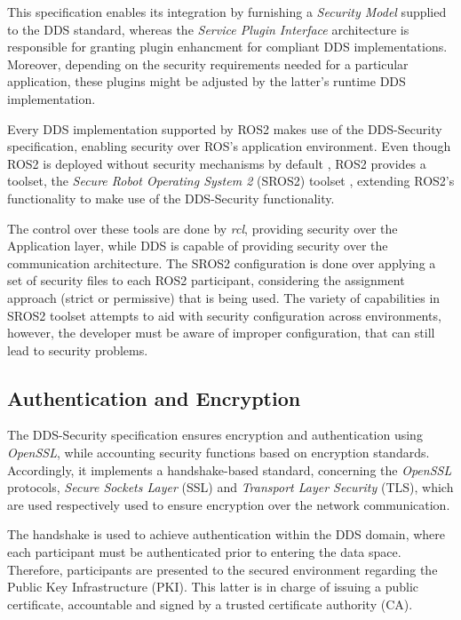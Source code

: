 This specification enables its integration by furnishing a \textit{Security Model} supplied to the DDS standard, whereas the \textit{Service Plugin Interface} architecture is responsible for granting plugin enhancment for compliant DDS implementations. Moreover, depending on the security requirements needed for a particular application, these plugins might be adjusted by the latter's runtime DDS implementation. \cite{dds-s}

Every DDS implementation supported by ROS2 makes use of the DDS-Security specification, enabling security over ROS's application environment. Even though ROS2 is deployed without security mechanisms by default \cite{ros-dds-integration}, ROS2 provides a toolset, the \textit{Secure Robot Operating System 2} (SROS2) toolset \cite{sros2-gh}, extending ROS2's functionality to make use of the DDS-Security functionality. 

The control over these tools are done by \textit{rcl}, providing security over the Application layer, while DDS is capable of providing security over the communication architecture. \cite{kim2018security} The SROS2 configuration is done over applying a set of security files to each ROS2 participant, considering the assignment approach (strict or permissive) that is being used. The variety of capabilities in SROS2 toolset attempts to aid with security configuration across environments, however, the developer must be aware of improper configuration, that can still lead to security problems. \cite{ros-dds-integration}

\subsection{Authentication and Encryption}

The DDS-Security specification ensures encryption and authentication using \textit{OpenSSL}, while accounting security functions based on encryption standards. \cite{takemoto2019performance} Accordingly, it implements a handshake-based standard, concerning the \textit{OpenSSL} protocols, \textit{Secure Sockets Layer} (SSL) and \textit{Transport Layer Security} (TLS), which are used respectively used to ensure encryption over the network communication. \cite{white2016sros, kim2018security}

The handshake is used to achieve authentication within the DDS domain, where each participant must be authenticated prior to entering the data space. \cite{white2019network} Therefore, participants are presented to the secured environment regarding the Public Key Infrastructure (PKI). This latter is in charge of issuing a public certificate, accountable and signed by a trusted certificate authority (CA). \cite{white2019network, white2016sros} 

